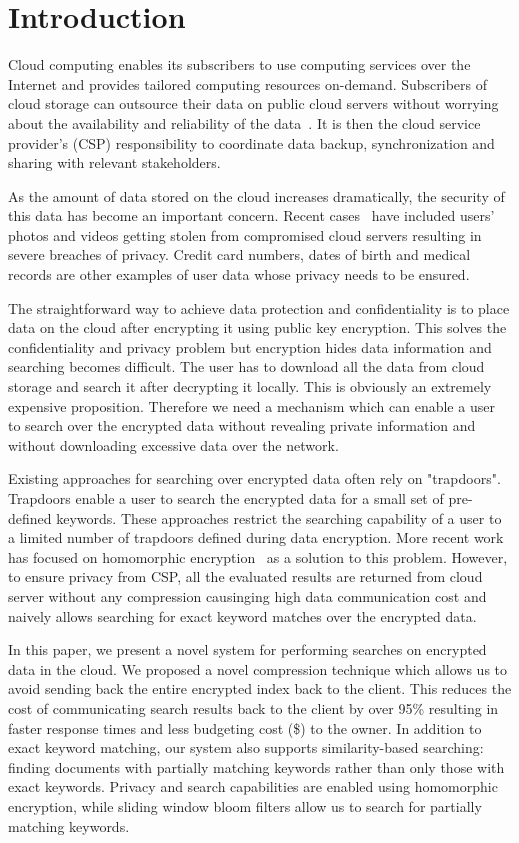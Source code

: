 \section{Introduction}

Cloud computing enables its subscribers to use computing services over the 
Internet and provides tailored computing resources on-demand. 
Subscribers of cloud storage can outsource their data on public cloud servers
without worrying about the availability and
reliability of the data~\cite{wang2012toward}. It is then the cloud service provider's (CSP) 
responsibility to coordinate data backup, synchronization and sharing
with relevant stakeholders. 

As the amount of data stored on the cloud increases dramatically, the security 
of this data has become an important concern. Recent cases~\cite{top_threats}
have included users' photos and videos getting stolen from compromised cloud servers resulting in
severe breaches of privacy. Credit card numbers, dates of birth and medical
records are other examples of user data whose privacy needs to be ensured.

The straightforward way to achieve data protection and confidentiality is to
place data on the cloud after encrypting it using public key encryption.
This solves the confidentiality and privacy problem
but encryption hides data information and searching becomes difficult. The user
has to download all the data from cloud storage and search it after decrypting it locally. This is
obviously an extremely expensive proposition. Therefore we need a mechanism 
which can enable a user to search over the encrypted data without revealing 
private information and without downloading excessive data over the network.

Existing approaches for searching over encrypted data often rely on
"trapdoors". Trapdoors enable a user to search the encrypted data for a small 
set of pre-defined keywords. These approaches restrict the searching
capability of a user to a limited number of trapdoors defined during data 
encryption. More recent work has focused on homomorphic encryption~\cite{craig} as a solution
to this problem. However, to ensure privacy from CSP, all the evaluated results
are returned from cloud server without any compression causinging high data
communication cost and naively allows searching for exact keyword matches over the encrypted data.

In this paper, we present a novel system for performing searches on encrypted 
data in the cloud. We proposed a novel compression technique which allows us to
avoid sending back the entire encrypted index back to the client. This reduces the cost of
communicating search results back to the client by over 95\% resulting in 
faster response times and less budgeting cost (\$) to the owner. In addition to exact keyword matching, our system also
supports similarity-based searching: finding documents with partially matching 
keywords rather than only those with exact keywords. Privacy and search 
capabilities are enabled using homomorphic encryption, while sliding window 
bloom filters allow us to search for partially matching keywords. 


